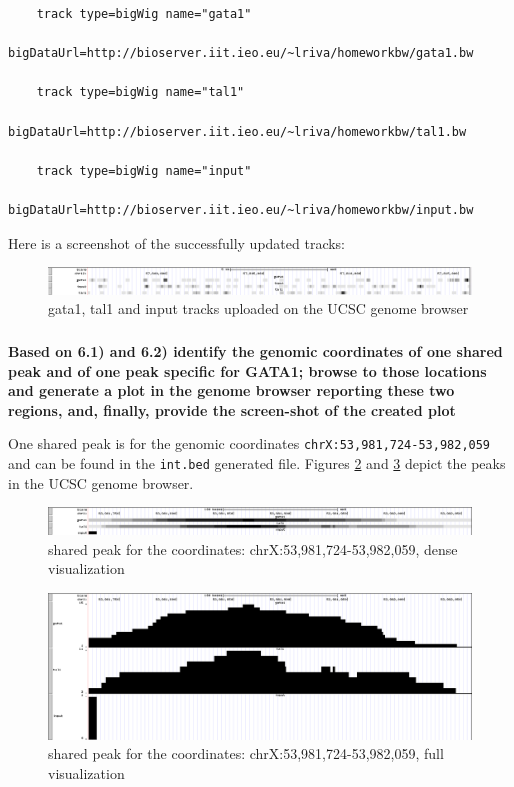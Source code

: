 \documentclass[12pt, a4paper]{article}
\begin{document}
	
	\begin{verbatim}
	track type=bigWig name="gata1"
	      bigDataUrl=http://bioserver.iit.ieo.eu/~lriva/homeworkbw/gata1.bw
	
	track type=bigWig name="tal1"
	      bigDataUrl=http://bioserver.iit.ieo.eu/~lriva/homeworkbw/tal1.bw
	
	track type=bigWig name="input"
	      bigDataUrl=http://bioserver.iit.ieo.eu/~lriva/homeworkbw/input.bw
	\end{verbatim}	
	
	Here is a screenshot of the successfully updated tracks:
	
	\begin{figure}[h]
		\centering
		\includegraphics[width = 1.15\textwidth, height = .08\textheight]{browser_tracks}
		\caption{gata1, tal1 and input tracks uploaded on the UCSC genome browser}
		\label{fig:browser_tracks}
	\end{figure}
	
	\subsubsection{}
	\textbf{Based on 6.1) and 6.2) identify the genomic coordinates of one shared peak and of one peak specific for GATA1; browse to those locations and generate a plot in the genome browser reporting these two regions, and, finally, provide the screen-shot of the created plot}
	
	One shared peak is for the genomic coordinates \verb|chrX:53,981,724-53,982,059| and can be found in the \verb|int.bed| generated file. Figures \ref{fig:browser_int_dense} and \ref{fig:browser_int_full} depict the peaks in the UCSC genome browser.
	
	\begin{figure}[h]
		\centering
		\includegraphics[width = 1.15\textwidth, height = .08\textheight]{browser_int_dense}
		\caption{shared peak for the coordinates: chrX:53,981,724-53,982,059, dense visualization}
		\label{fig:browser_int_dense}
	\end{figure}

	\begin{figure}[h]
		\centering
		\includegraphics[width = 1.15\textwidth]{browser_int_full}
		\caption{shared peak for the coordinates: chrX:53,981,724-53,982,059, full visualization}
		\label{fig:browser_int_full}
	\end{figure}
\end{document}
